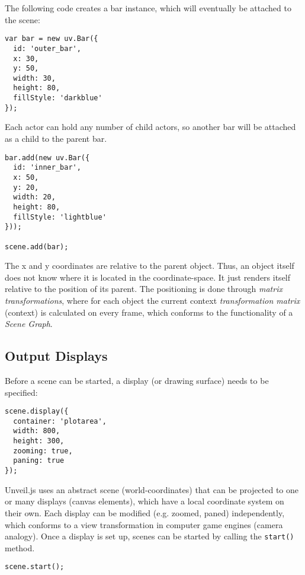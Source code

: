 \begin{english}
\SuperPar The following code creates a bar instance, which will eventually be attached to the scene:

\begin{verbatim}
var bar = new uv.Bar({
  id: 'outer_bar',
  x: 30,
  y: 50,
  width: 30,
  height: 80,
  fillStyle: 'darkblue'
});
\end{verbatim}

\SuperPar Each actor can hold any number of child actors, so another bar will be attached as a child to the parent bar.

\begin{verbatim}
bar.add(new uv.Bar({
  id: 'inner_bar',
  x: 50,
  y: 20,
  width: 20,
  height: 80,
  fillStyle: 'lightblue'
}));

scene.add(bar);
\end{verbatim}

\SuperPar The x and y coordinates are relative to the parent object. Thus, an object itself does not know where it is located in the coordinate-space. It just renders itself relative to the position of its parent. The positioning is done through \emph{matrix transformations}, where for each object the current context \emph{transformation matrix} (context) is calculated on every frame, which conforms to the functionality of a \emph{Scene Graph}.

\subsection{Output Displays}

Before a scene can be started, a display (or drawing surface) needs to be specified:

\begin{verbatim}
scene.display({
  container: 'plotarea',
  width: 800,
  height: 300,
  zooming: true,
  paning: true
});
\end{verbatim}

\SuperPar Unveil.js uses an abstract scene (world-coordinates) that can be projected to one or many displays (canvas elements), which have a local coordinate system on their own. Each display can be modified (e.g. zoomed, paned) independently, which conforms to a view transformation in computer game engines (camera analogy). Once a display is set up, scenes can be started by calling the \texttt{start()} method.

\begin{verbatim}
scene.start();
\end{verbatim}


\end{english}
